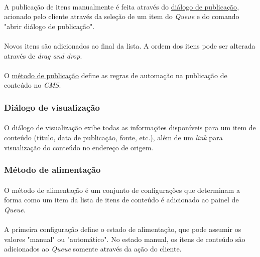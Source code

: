 \documentclass[a4paper,12pt]{article}
\def\blog{\emph{CMS}}
\def\queue{\emph{Queue}}
\def\dragndrop{\emph{drag and drop}}
\def\metodopublicacao{\hyperref[metodopublicacao]{método de publicação}}
\def\dialogopublicacao{\hyperref[dialogopublicacao]{diálogo de publicação}}
\begin{document}
\paragraph{}
A publicação de itens manualmente é feita através do \dialogopublicacao{},
acionado pelo cliente através da seleção de um item do \queue{} e do comando
"abrir diálogo de publicação".

\paragraph{}
Novos itens são adicionados ao final da lista. A ordem dos itens pode ser
alterada através de \dragndrop{}.

\paragraph{}
O \metodopublicacao{} define as regras de automação na publicação de conteúdo
no \blog{}.

\subsubsection{Diálogo de visualização} \label{dialogovisualizacao}

\paragraph{}
O diálogo de visualização exibe todas as informações disponíveis para um item
de conteúdo (título, data de publicação, fonte, etc.), além de um \emph{link}
para visualização do conteúdo no endereço de origem.

\subsubsection{Método de alimentação} \label{metodoalimentacao}

\paragraph{}
O método de alimentação é um conjunto de configurações que determinam a forma
como um item da lista de itens de conteúdo é adicionado ao painel de \queue{}.

\paragraph{}
A primeira configuração define o estado de alimentação, que pode assumir os
valores "manual" ou "automático". No estado manual, os itens de conteúdo são
adicionados ao \queue{} somente através da ação do cliente.
\end{document}

